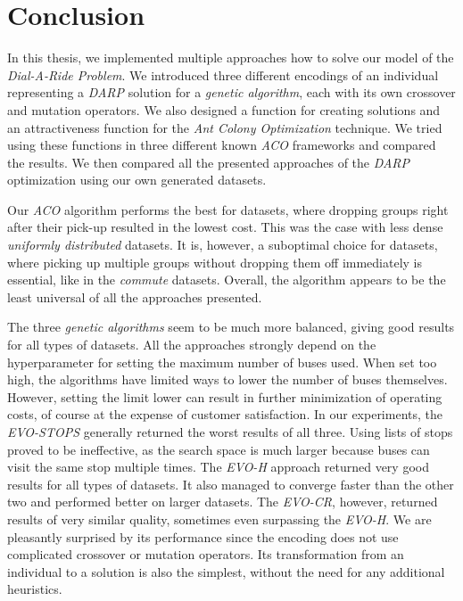 \chapter*{Conclusion}

In this thesis, we implemented multiple approaches how to solve our model of the \textit{Dial-A-Ride Problem}. We introduced three different encodings of an individual representing a \textit{DARP} solution for a \textit{genetic algorithm}, each with its own crossover and mutation operators. We also designed a function for creating solutions and an attractiveness function for the \textit{Ant Colony Optimization} technique. We tried using these functions in three different known \textit{ACO} frameworks and compared the results. We then compared all the presented approaches of the \textit{DARP} optimization using our own generated datasets.

Our \textit{ACO} algorithm performs the best for datasets, where dropping groups right after their pick-up resulted in the lowest cost. This was the case with less dense \textit{uniformly distributed} datasets. It is, however, a suboptimal choice for datasets, where picking up multiple groups without dropping them off immediately is essential, like in the \textit{commute} datasets. Overall, the algorithm appears to be the least universal of all the approaches presented.

The three \textit{genetic algorithms} seem to be much more balanced, giving good results for all types of datasets. All the approaches strongly depend on the hyperparameter for setting the maximum number of buses used. When set too high, the algorithms have limited ways to lower the number of buses themselves. However, setting the limit lower can result in further minimization of operating costs, of course at the expense of customer satisfaction. In our experiments, the \textit{EVO-STOPS} generally returned the worst results of all three. Using lists of stops proved to be ineffective, as the search space is much larger because buses can visit the same stop multiple times. The \textit{EVO-H} approach returned very good results for all types of datasets. It also managed to converge faster than the other two and performed better on larger datasets. The \textit{EVO-CR}, however, returned results of very similar quality, sometimes even surpassing the \textit{EVO-H}. We are pleasantly surprised by its performance since the encoding does not use complicated crossover or mutation operators. Its transformation from an individual to a solution is also the simplest, without the need for any additional heuristics.

